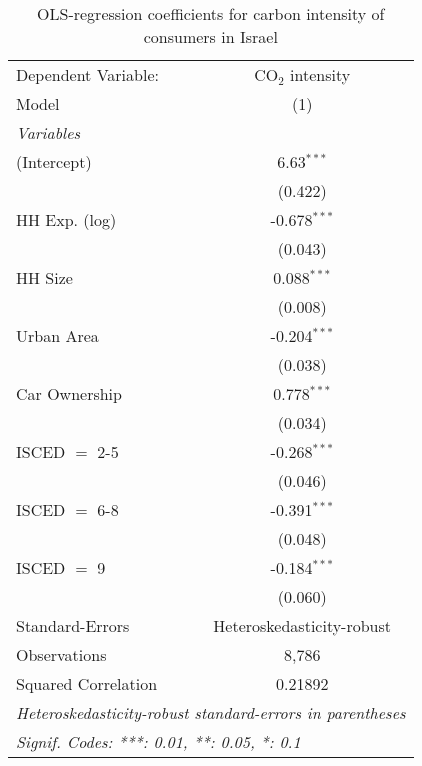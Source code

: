 
\begin{table}[htbp!]
   \centering
   \small
   \begin{adjustbox}{width = 1\textwidth, max height = 0.95\textheight, center}
      \begin{threeparttable}[b]
         \caption{\label{tab:OLS_1_ISR} OLS-regression coefficients for carbon intensity of consumers in Israel}
         \begin{tabular}{lc}
            \tabularnewline \midrule \midrule
            Dependent Variable: & CO$_{2}$ intensity\\  
            Model               & (1)\\  
            \midrule
            \emph{Variables}\\
            (Intercept)         & 6.63$^{***}$\\   
                                & (0.422)\\   
            HH Exp. (log)       & -0.678$^{***}$\\   
                                & (0.043)\\   
            HH Size             & 0.088$^{***}$\\   
                                & (0.008)\\   
            Urban Area          & -0.204$^{***}$\\   
                                & (0.038)\\   
            Car Ownership       & 0.778$^{***}$\\   
                                & (0.034)\\   
            ISCED $=$ 2-5       & -0.268$^{***}$\\   
                                & (0.046)\\   
            ISCED $=$ 6-8       & -0.391$^{***}$\\   
                                & (0.048)\\   
            ISCED $=$ 9         & -0.184$^{***}$\\   
                                & (0.060)\\   
            \midrule 
            Standard-Errors     & Heteroskedasticity-robust \\   
            Observations        & 8,786\\  
            Squared Correlation & 0.21892\\  
            \midrule \midrule
            \multicolumn{2}{l}{\emph{Heteroskedasticity-robust standard-errors in parentheses}}\\
            \multicolumn{2}{l}{\emph{Signif. Codes: ***: 0.01, **: 0.05, *: 0.1}}\\
         \end{tabular}
         

\end{threeparttable}
\end{adjustbox}
\end{table}
